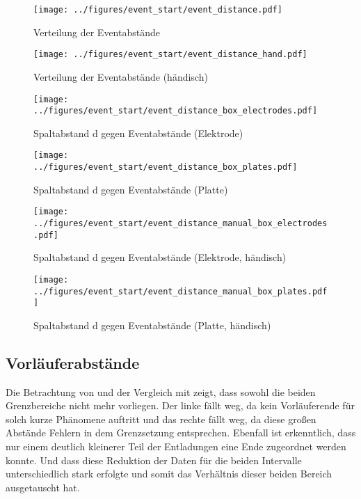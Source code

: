 \begin{figure}[htbp]
    \centering
    \begin{minipage}[t]{0.47\textwidth}
      \centering
      \texttt{[image: ../figures/event\_start/event\_distance.pdf]}
      \caption{Verteilung der Eventabstände}
      \label{fig:histogram-eventdistance}
    \end{minipage}
 \begin{minipage}[t]{0.47\textwidth}
      \centering
      \texttt{[image: ../figures/event\_start/event\_distance\_hand.pdf]}
      \caption{Verteilung der Eventabstände (händisch)}
      \label{fig:histogram-eventdistance-hand}
  \end{minipage}
\end{figure}

\begin{figure}[htbp]
    \centering
    \begin{minipage}[t]{0.47\textwidth}
      \centering
      \texttt{[image: ../figures/event\_start/event\_distance\_box\_electrodes.pdf]}
      \caption{Spaltabstand d gegen Eventabstände (Elektrode)}
      \label{fig:box-eventdistance-electrode}
   \end{minipage}
 \begin{minipage}[t]{0.47\textwidth}
      \centering
      \texttt{[image: ../figures/event\_start/event\_distance\_box\_plates.pdf]}
      \caption{Spaltabstand d gegen Eventabstände (Platte)}
      \label{fig:box-eventdistance-plate}
  \end{minipage}
\begin{minipage}[t]{0.47\textwidth}
      \centering
      \texttt{[image: ../figures/event\_start/event\_distance\_manual\_box\_electrodes.pdf]}
      \caption{Spaltabstand d gegen Eventabstände (Elektrode, händisch)}
      \label{fig:box-eventdistance-electrode-hand}
   \end{minipage}
 \begin{minipage}[t]{0.47\textwidth}
      \centering
      \texttt{[image: ../figures/event\_start/event\_distance\_manual\_box\_plates.pdf]}
      \caption{Spaltabstand d gegen Eventabstände (Platte, händisch)}
      \label{fig:box-eventdistance-plate-hand}
  \end{minipage}

\end{figure}

\subsection{Vorläuferabstände}
Die Betrachtung von  und der Vergleich mit  zeigt, dass sowohl die beiden Grenzbereiche nicht mehr vorliegen. Der linke fällt weg, da kein Vorläuferende für solch kurze Phänomene auftritt und das rechte fällt weg, da diese großen Abstände Fehlern in dem Grenzsetzung entsprechen. Ebenfall ist erkenntlich, dass nur einem deutlich kleinerer Teil der Entladungen eine Ende zugeordnet werden konnte. Und dass diese Reduktion der Daten für die beiden Intervalle unterschiedlich stark erfolgte und somit das Verhältnis dieser beiden Bereich ausgetauscht hat.


